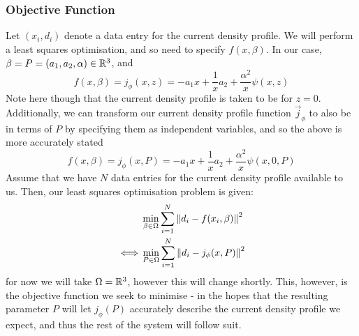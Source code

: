 \subsubsection{Objective Function}
Let $(x_i, d_i)$ denote a data entry for the current density profile. We will perform a least squares optimisation, and so need to specify $f(x, \beta)$. 
In our case, $\beta = P = (a_1, a_2, \alpha) \in \mathbb{R}^3$, and
\begin{equation*}
    f(x, \beta) = j_{\phi}(x, z) = -a_1 x + \frac{1}{x} a_2 + \frac{\alpha^2}{x} \psi(x, z)
\end{equation*}
Note here though that the current density profile is taken to be for $z = 0$. Additionally, we can transform our current density profile function 
$\vec{j}_{\phi}$ to also be in terms of $P$ by specifying them as independent variables, and so the above is more accurately stated
\begin{equation*}
    f(x, \beta) = j_{\phi}(x, P) = -a_1 x + \frac{1}{x} a_2 + \frac{\alpha^2}{x} \psi(x, 0, P)
\end{equation*}
Assume that we have $N$ data entries for the current density profile available to us. Then, our least squares optimisation problem is given:
\begin{align*}
    \notag& \min_{\beta \in \Omega} \sum_{i = 1}^{N} \norm{d_i - f(x_i, \beta)}^2 \\
    \iff& \min_{P \in \Omega} \sum_{i = 1}^{N} \norm{d_i - j_{\phi}(x, P)}^2 
\end{align*}
for now we will take $\Omega = \mathbb{R}^3$, however this will change shortly. This, however, is the objective function we seek to minimise - 
in the hopes that the resulting parameter $P$ will let $j_{\phi}(P)$ accurately describe the current density profile we expect, and thus 
the rest of the system will follow suit.

